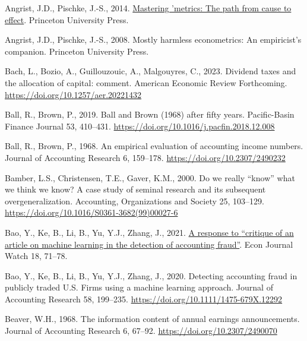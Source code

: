 \documentclass[
  letterpaper,
  DIV=11,
  numbers=noendperiod]{scrartcl}
\newlength{\cslhangindent}
\newlength{\cslentryspacingunit} %
\newenvironment{CSLReferences}[2] %
 {%
  \setlength{\parindent}{0pt}
  \ifodd #1
  \let\oldpar\par
  \def\par{\hangindent=\cslhangindent\oldpar}
  \fi
  \setlength{\parskip}{#2\cslentryspacingunit}
 }%
 {}
\begin{document}
\hypertarget{refs}{}
\begin{CSLReferences}{1}{0}
\leavevmode{}%
Angrist, J.D., Pischke, J.-S., 2014.
\href{https://books.google.com/books?id=dEh-BAAAQBAJ}{Mastering
'metrics: The path from cause to effect}. Princeton University Press.

\leavevmode{}%
Angrist, J.D., Pischke, J.-S., 2008. Mostly harmless econometrics: An
empiricist's companion. Princeton University Press.

\leavevmode{}%
Bach, L., Bozio, A., Guillouzouic, A., Malgouyres, C., 2023. Dividend
taxes and the allocation of capital: comment. American Economic Review
Forthcoming. \url{https://doi.org/10.1257/aer.20221432}

\leavevmode{}%
Ball, R., Brown, P., 2019. {B}all and {B}rown (1968) after fifty years.
Pacific-Basin Finance Journal 53, 410--431.
\url{https://doi.org/10.1016/j.pacfin.2018.12.008}

\leavevmode{}%
Ball, R., Brown, P., 1968. An empirical evaluation of accounting income
numbers. Journal of Accounting Research 6, 159--178.
\url{https://doi.org/10.2307/2490232}

\leavevmode{}%
Bamber, L.S., Christensen, T.E., Gaver, K.M., 2000. Do we really
{``know''} what we think we know? A case study of seminal research and
its subsequent overgeneralization. Accounting, Organizations and Society
25, 103--129. \url{https://doi.org/10.1016/S0361-3682(99)00027-6}

\leavevmode{}%
Bao, Y., Ke, B., Li, B., Yu, Y.J., Zhang, J., 2021.
\href{https://econjwatch.org/articles/a-response-to-critique-of-an-article-on-machine-learning-in-the-detection-of-accounting-fraud}{A
response to {``critique of an article on machine learning in the
detection of accounting fraud''}}. Econ Journal Watch 18, 71--78.

\leavevmode{}%
Bao, Y., Ke, B., Li, B., Yu, Y.J., Zhang, J., 2020. Detecting accounting
fraud in publicly traded {U.S.} Firms using a machine learning approach.
Journal of Accounting Research 58, 199--235.
\url{https://doi.org/10.1111/1475-679X.12292}

\leavevmode{}%
Beaver, W.H., 1968. The information content of annual earnings
announcements. Journal of Accounting Research 6, 67--92.
\url{https://doi.org/10.2307/2490070}


\end{CSLReferences}
\end{document}
